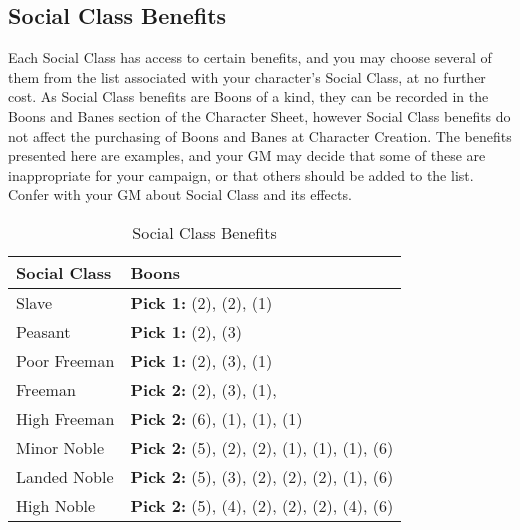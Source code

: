 \documentclass[oneside,11pt,english]{book}
\begin{document}
\subsection{Social Class Benefits} Each Social Class has access to certain benefits, and you may choose several of them from the list associated with your character’s Social Class, at no further cost. As Social Class benefits are Boons of a kind, they can be recorded in the Boons and Banes section of the Character Sheet, however Social Class benefits do not affect the purchasing of Boons and Banes at Character Creation.
The benefits presented here are examples, and your GM may decide that some of these are inappropriate for your campaign, or that others should be added to the list. Confer with your GM about Social Class and its effects.

\begin{table}[hb]
	\centering
	\caption{Social Class Benefits}
	\label{Social Class Benefits}
	\begin{tabu} spread 0pt{X[-1]X}
Social Class	&Boons\\\toprule
Slave			&\textbf{Pick 1:}  (2),  (2),  (1)\\
Peasant			&\textbf{Pick 1:}  (2),  (3)\\
Poor Freeman	&\textbf{Pick 1:}  (2),  (3),  (1)\\
Freeman			&\textbf{Pick 2:}  (2),  (3),  (1),\\
High Freeman	&\textbf{Pick 2:}  (6),  (1),  (1),  (1)\\
Minor Noble		&\textbf{Pick 2:}  (5),  (2),  (2),  (1),  (1),  (1),  (6)\\
Landed Noble	&\textbf{Pick 2:}  (5),  (3),  (2),  (2),  (2),  (1),  (6)\\
High Noble		&\textbf{Pick 2:}  (5),  (4),  (2),  (2),  (2),  (4),  (6)\\

\end{tabu}
\end{table}
\end{document}

